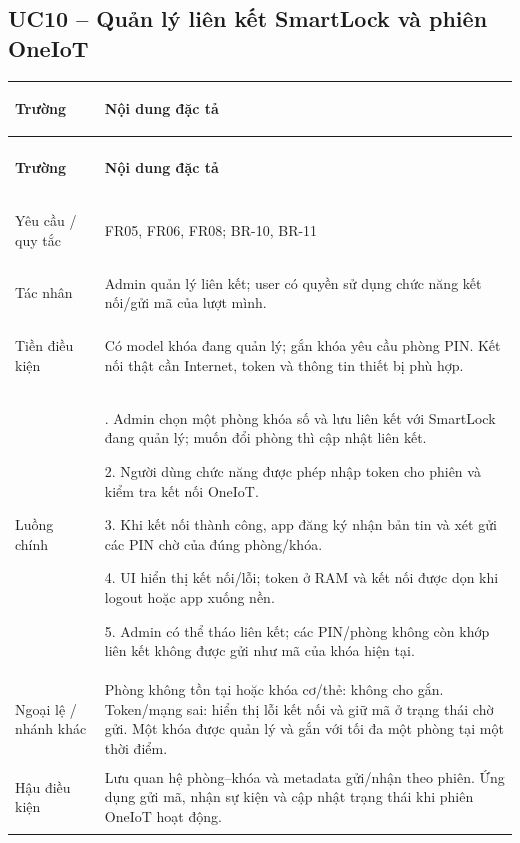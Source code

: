 \subsection{UC10 -- Quản lý liên kết SmartLock và phiên OneIoT}\label{tab:uc10}
{\small\renewcommand{\arraystretch}{1.06}
\setlength{\tabcolsep}{6pt}\setlength{\extrarowheight}{2pt}
\renewcommand{\theHtable}{uc.\arabic{subsection}}\addtocounter{table}{-1}
\begin{longtable}{|>{\bfseries\raggedright\arraybackslash}p{3cm}|>{\raggedright\arraybackslash}p{\dimexpr\textwidth-3cm-4\tabcolsep-3\arrayrulewidth\relax}|}
\hline
\textbf{Trường} & \textbf{Nội dung đặc tả}\\\hline
\endfirsthead
\multicolumn{2}{r}{\small\itshape UC10 (tiếp)}\\
\hline
\textbf{Trường} & \textbf{Nội dung đặc tả}\\\hline
\endhead
\endlastfoot
Yêu cầu / quy tắc & FR05, FR06, FR08; BR-10, BR-11\\*\hline
Tác nhân & Admin quản lý liên kết; user có quyền sử dụng chức năng kết nối/gửi mã của lượt mình.\\*\hline
Tiền điều kiện & Có model khóa đang quản lý; gắn khóa yêu cầu phòng PIN. Kết nối thật cần Internet, token và thông tin thiết bị phù hợp.\\*\hline
Luồng chính & 1. Admin chọn một phòng khóa số và lưu liên kết với SmartLock đang quản lý; muốn đổi phòng thì cập nhật liên kết.\par
2. Người dùng chức năng được phép nhập token cho phiên và kiểm tra kết nối OneIoT.\par
3. Khi kết nối thành công, app đăng ký nhận bản tin và xét gửi các PIN chờ của đúng phòng/khóa.\par
4. UI hiển thị kết nối/lỗi; token ở RAM và kết nối được dọn khi logout hoặc app xuống nền.\par
5. Admin có thể tháo liên kết; các PIN/phòng không còn khớp liên kết không được gửi như mã của khóa hiện tại.\\\hline
Ngoại lệ / nhánh khác & Phòng không tồn tại hoặc khóa cơ/thẻ: không cho gắn. Token/mạng sai: hiển thị lỗi kết nối và giữ mã ở trạng thái chờ gửi. Một khóa được quản lý và gắn với tối đa một phòng tại một thời điểm.\\\hline
Hậu điều kiện & Lưu quan hệ phòng--khóa và metadata gửi/nhận theo phiên. Ứng dụng gửi mã, nhận sự kiện và cập nhật trạng thái khi phiên OneIoT hoạt động.\\\hline
\end{longtable}}

